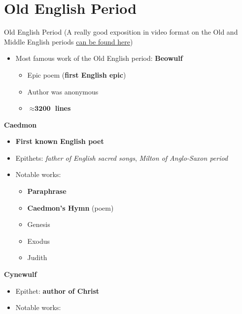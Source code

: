 \documentclass[
  12pt,
    progressbar=frametitle]{beamer}
\providecommand{\tightlist}{%
  \setlength{\itemsep}{0pt}\setlength{\parskip}{0pt}}
\begin{document}
\section{Old English Period}
\begin{frame}[allowframebreaks]
{Old English Period}
\scriptsize(A really good exposition in video format on the Old and
Middle English periods
\href{https://youtu.be/sYLopdePO2A}{can be found here})
\normalsize\vspace{-3mm}

\begin{itemize}
\tightlist
\item
  Most famous work of the Old English period: \textbf{Beowulf}

  \begin{itemize}
  \tightlist
  \item
    Epic poem (\textbf{first English epic})
  \item
    Author was anonymous
  \item
    \textbf{\(\boldsymbol\approx \textbf{3200}\) lines}
  \end{itemize}
\end{itemize}

\large\textbf{Caedmon}\normalsize\vspace{-3mm}

\begin{itemize}
\tightlist
\item
  \textbf{First known English poet}
\item
  Epithets: \emph{father of English sacred songs}, \emph{Milton of
  Anglo-Saxon period}
\item
  Notable works:

  \begin{itemize}
  \tightlist
  \item
    \textbf{Paraphrase}
  \item
    \textbf{Caedmon's Hymn} (poem)
  \item
    Genesis
  \item
    Exodus
  \item
    Judith
  \end{itemize}
\end{itemize}

\large\textbf{Cynewulf}\normalsize\vspace{-3mm}

\begin{itemize}
\tightlist
\item
  Epithet: \textbf{author of Christ}
\item
  Notable works:


\end{itemize}
\end{frame}
\end{document}
